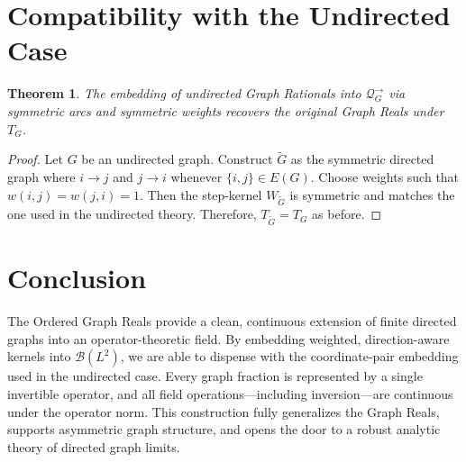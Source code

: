 \documentclass[11pt]{article}
\theoremstyle{definition}
\theoremstyle{plain}
\newtheorem{theorem}[definition]{Theorem}
\theoremstyle{remark}
\begin{document}
\section{Compatibility with the Undirected Case}

\begin{theorem}
The embedding of undirected Graph Rationals into \( \mathcal{Q}_G^\to \) via symmetric arcs and symmetric weights recovers the original Graph Reals under \( T_G \).
\end{theorem}

\begin{proof}
Let \( G \) be an undirected graph. Construct \( \tilde{G} \) as the symmetric directed graph where \( i \to j \) and \( j \to i \) whenever \( \{i,j\} \in E(G) \). Choose weights such that \( w(i,j) = w(j,i) = 1 \). Then the step-kernel \( W_{\tilde{G}} \) is symmetric and matches the one used in the undirected theory. Therefore, \( T_{\tilde{G}} = T_G \) as before.
\end{proof}

\section{Conclusion}

The Ordered Graph Reals provide a clean, continuous extension of finite directed graphs into an operator-theoretic field. By embedding weighted, direction-aware kernels into \( \mathcal{B}(L^2) \), we are able to dispense with the coordinate-pair embedding used in the undirected case. Every graph fraction is represented by a single invertible operator, and all field operations—including inversion—are continuous under the operator norm. This construction fully generalizes the Graph Reals, supports asymmetric graph structure, and opens the door to a robust analytic theory of directed graph limits.
\end{document}

